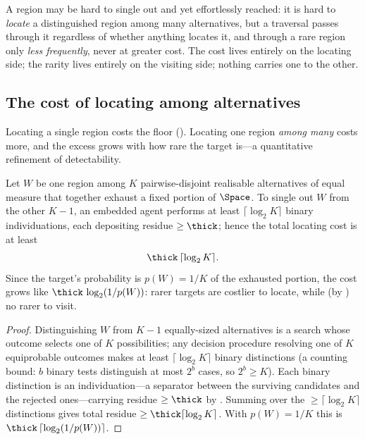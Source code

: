 \begin{remark}
\label{rem:needle}
A region may be hard to single out and yet effortlessly reached: it is hard to
\emph{locate} a distinguished region among many alternatives, but a traversal
passes through it regardless of whether anything locates it, and through a rare
region only \emph{less frequently}, never at greater cost. The cost lives entirely
on the locating side; the rarity lives entirely on the visiting side; nothing
carries one to the other.
\end{remark}

\subsection{The cost of locating among alternatives}

Locating a single region costs the floor (). Locating one
region \emph{among many} costs more, and the excess grows with how rare the target
is---a quantitative refinement of detectability.

\begin{theorem}
\label{thm:locating-cost}
Let $W$ be one region among $K$ pairwise-disjoint realisable alternatives of equal
measure that together exhaust a fixed portion of $\Space$. To single out $W$ from
the other $K-1$, an embedded agent performs at least $\lceil\log_2 K\rceil$ binary
individuations, each depositing residue $\ge\thick$; hence the total locating cost
is at least
\[
\thick\,\lceil\log_2 K\rceil .
\]
Since the target's probability is $p(W)=1/K$ of the exhausted portion, the cost
grows like $\thick\,\log_2(1/p(W))$: rarer targets are costlier to locate, while
\textup{(}by \textup{)} no rarer to visit.
\end{theorem}

\begin{proof}
Distinguishing $W$ from $K-1$ equally-sized alternatives is a search whose outcome
selects one of $K$ possibilities; any decision procedure resolving one of $K$
equiprobable outcomes makes at least $\lceil\log_2 K\rceil$ binary distinctions
(a counting bound: $b$ binary tests distinguish at most $2^{b}$ cases, so
$2^{b}\ge K$). Each binary distinction is an individuation---a separator between
the surviving candidates and the rejected ones---carrying residue $\ge\thick$ by
. Summing over the $\ge\lceil\log_2 K\rceil$ distinctions
gives total residue $\ge\thick\lceil\log_2 K\rceil$. With $p(W)=1/K$ this is
$\thick\,\lceil\log_2(1/p(W))\rceil$.
\end{proof}

